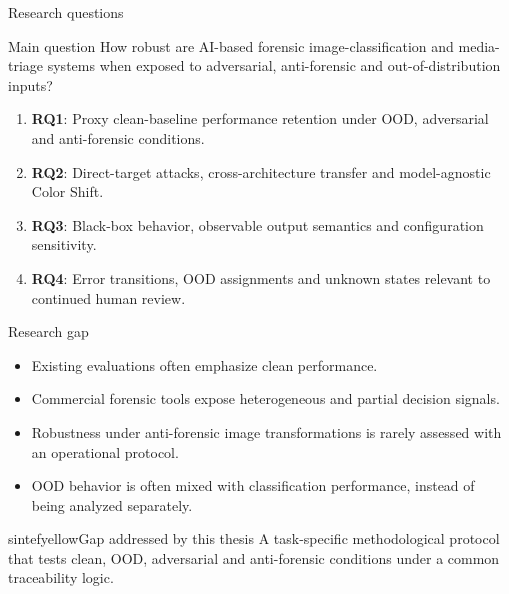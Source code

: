 \documentclass{beamer}
\newcommand{\highlight}[1]{\textcolor{maincolor}{\textbf{#1}}}
\begin{document}
\begin{frame}{Research questions}

\begin{block}{Main question}
How robust are AI-based forensic image-classification and media-triage systems when exposed to adversarial, anti-forensic and out-of-distribution inputs?
\end{block}

\small

\begin{enumerate}
    \item \highlight{RQ1}: Proxy clean-baseline performance retention under OOD, adversarial and anti-forensic conditions.
    \item \highlight{RQ2}: Direct-target attacks, cross-architecture transfer and model-agnostic Color Shift.
    \item \highlight{RQ3}: Black-box behavior, observable output semantics and configuration sensitivity.
    \item \highlight{RQ4}: Error transitions, OOD assignments and unknown states relevant to continued human review.
\end{enumerate}

\end{frame}


\begin{frame}{Research gap}

\begin{itemize}
    \item Existing evaluations often emphasize clean performance.
    \item Commercial forensic tools expose heterogeneous and partial decision signals.
    \item Robustness under anti-forensic image transformations is rarely assessed with an operational protocol.
    \item OOD behavior is often mixed with classification performance, instead of being analyzed separately.
\end{itemize}

\begin{colorblock}[black]{sintefyellow}{Gap addressed by this thesis}
A task-specific methodological protocol that tests clean, OOD, adversarial and anti-forensic conditions under a common traceability logic.
\end{colorblock}

\end{frame}
\end{document}
